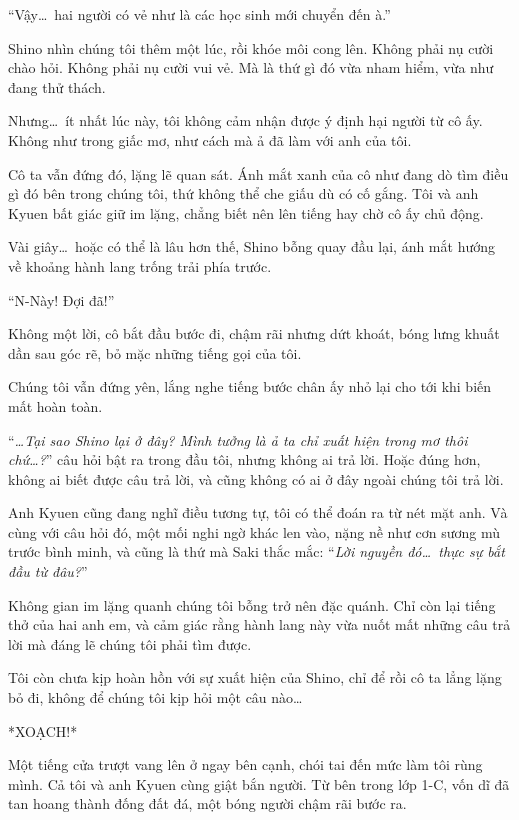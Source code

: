 \documentclass[../main.tex]{subfiles}
\begin{document}

``Vậy\dots\ hai người có vẻ như là các học sinh mới chuyển đến à.''

Shino nhìn chúng tôi thêm một lúc, rồi khóe môi cong lên. Không phải nụ cười chào hỏi. Không phải nụ cười vui vẻ. Mà là thứ gì đó vừa nham hiểm, vừa như đang thử thách.

Nhưng\dots\ ít nhất lúc này, tôi không cảm nhận được ý định hại người từ cô ấy. Không như trong giấc mơ, như cách mà ả đã làm với anh của tôi.

Cô ta vẫn đứng đó, lặng lẽ quan sát. Ánh mắt xanh của cô như đang dò tìm điều gì đó bên trong chúng tôi, thứ không thể che giấu dù có cố gắng. Tôi và anh Kyuen bất giác giữ im lặng, chẳng biết nên lên tiếng hay chờ cô ấy chủ động.

Vài giây\dots\ hoặc có thể là lâu hơn thế, Shino bỗng quay đầu lại, ánh mắt hướng về khoảng hành lang trống trải phía trước.

``N-Này! Đợi đã!''

Không một lời, cô bắt đầu bước đi, chậm rãi nhưng dứt khoát, bóng lưng khuất dần sau góc rẽ, bỏ mặc những tiếng gọi của tôi.

Chúng tôi vẫn đứng yên, lắng nghe tiếng bước chân ấy nhỏ lại cho tới khi biến mất hoàn toàn.

``\textit{\dots Tại sao Shino lại ở đây? Mình tưởng là ả ta chỉ xuất hiện trong mơ thôi chứ\dots?}''  câu hỏi bật ra trong đầu tôi, nhưng không ai trả lời. Hoặc đúng hơn, không ai biết được câu trả lời, và cũng không có ai ở đây ngoài chúng tôi trả lời.

Anh Kyuen cũng đang nghĩ điều tương tự, tôi có thể đoán ra từ nét mặt anh. Và cùng với câu hỏi đó, một mối nghi ngờ khác len vào, nặng nề như cơn sương mù trước bình minh, và cũng là thứ mà Saki thắc mắc: ``\textit{Lời nguyền đó\dots\ thực sự bắt đầu từ đâu?}''

Không gian im lặng quanh chúng tôi bỗng trở nên đặc quánh. Chỉ còn lại tiếng thở của hai anh em, và cảm giác rằng hành lang này vừa nuốt mất những câu trả lời mà đáng lẽ chúng tôi phải tìm được.

Tôi còn chưa kịp hoàn hồn với sự xuất hiện của Shino, chỉ để rồi cô ta lẳng lặng bỏ đi, không để chúng tôi kịp hỏi một câu nào\dots

*XOẠCH!*

Một tiếng cửa trượt vang lên ở ngay bên cạnh, chói tai đến mức làm tôi rùng mình. Cả tôi và anh Kyuen cùng giật bắn người. Từ bên trong lớp 1-C, vốn dĩ đã tan hoang thành đống đất đá, một bóng người chậm rãi bước ra.
\end{document}
